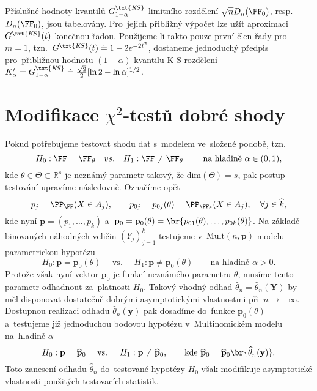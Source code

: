 Příslušné hodnoty kvantilů $G_{1-\alpha}^{\txt{K\!S}}$ limitního rozdělení $\sqrt{n}D_n(\FF_0)$, resp. $D_n(\FF_0)$, jsou tabelovány. Pro~jejich přibližný výpočet lze užít aproximaci $G^{\txt{K\!S}}(t)$ konečnou řadou. Použijeme-li takto pouze první člen řady pro~$m=1$, tzn.\ $G^{\txt{K\!S}}(t)\doteq 1-2 e^{-2t^2}$, dostaneme jednoduchý předpis pro~přibližnou hodnotu $(1-\alpha)$-kvantilu K-S rozdělení $K'_\alpha=G_{1-\alpha}^{\txt{K\!S}}\doteq \frac{\sqrt{2}}{2}[\ln 2-\ln \alpha]^{1/2}$.


\section{Modifikace $\chi^2$-testů dobré shody}
Pokud potřebujeme testovat shodu dat s~modelem ve~složené podobě, tzn.\
$$ H_0: \FF=\FF_\theta \quad vs. \quad H_1: \FF\neq \FF_\theta \qquad\text{ na~hladině }\alpha\in(0,1),$$
kde $\theta\in\Theta\subset\mathbb{R}^s$ je neznámý parametr takový, že $\mathrm{dim}(\Theta)=s$, pak postup testování upravíme následovně. Označíme opět
$$ p_j=\PP_\FF(X\in A_j), \qquad p_{0j}=p_{0j}(\theta)=\PP_{\FF_\theta}(X\in A_j), \quad\forall j\in \widehat k,$$
kde nyní $\mathbf p=(p_1,\ldots,p_k)$ a~$\mathbf p_0=\mathbf p_0(\theta) = \br{p_{01}(\theta),\ldots,p_{0k}(\theta)}$.
Na základě binovaných náhodných veličin $(Y_j)_{j=1}^k$ testujeme v~$\mathrm{Mult}(n,\mathbf p)$ modelu parametrickou hypotézu
$$ H_0: \mathbf p = \mathbf{p}_0(\theta) \quad\text{ vs. }\quad H_1: \mathbf p \neq \mathbf{p}_0(\theta) \qquad\text{na hladině }\alpha>0. $$
Protože však nyní vektor $\mathbf p_0$ je funkcí neznámého parametru $\theta$, musíme tento parametr odhadnout za~platnosti $H_0$. Takový vhodný odhad $\widehat\theta_n=\widehat\theta_n(\mathbf Y)$ by měl disponovat dostatečně dobrými asymptotickými vlastnostmi při~$n\to+\infty$. Dostupnou realizaci odhadu $\widehat\theta_n(\mathbf y)$ pak dosadíme do~funkce $\mathbf p_0(\theta)$ a~testujeme již jednoduchou bodovou hypotézu v~Multinomickém modelu na~hladině $\alpha$
$$ H_0: \mathbf p = \widehat{\mathbf p}_0 \quad\text{ vs. }\quad H_1: \mathbf p \neq \widehat{\mathbf p}_0,
\qquad\text{kde } \widehat{\mathbf p}_0=\widehat{\mathbf p}_0\br{\widehat\theta_n(\mathbf y)}.$$
Toto zanesení odhadu $\widehat\theta_n$ do~testované hypotézy $H_0$ však modifikuje asymptotické vlastnosti použitých testovacích statistik.

